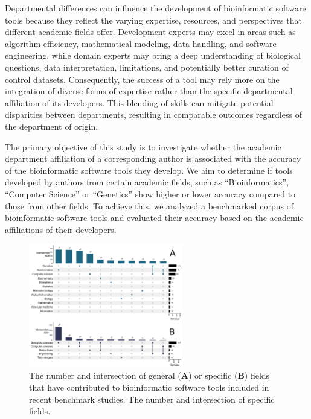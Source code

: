 \documentclass[fleqn,10pt,doc,onecolumn]{SelfArx}%
\begin{document}
Departmental differences can influence the development of
bioinformatic software tools because they reflect the varying
expertise, resources, and perspectives that different academic fields
offer. Development experts may excel in areas such as algorithm
efficiency, mathematical modeling, data handling, and software
engineering, while domain experts may bring a deep understanding of
biological questions, data interpretation, limitations, and
potentially better curation of control datasets. Consequently, the
success of a tool may rely more on the integration of diverse
forms of expertise rather than the specific departmental affiliation
of its developers. This blending of skills can mitigate potential
disparities between departments, resulting in comparable outcomes
regardless of the department of origin.


The primary objective of this study is to investigate whether the
academic department affiliation of a corresponding author is
associated with the accuracy of the bioinformatic software tools they
develop. We aim to determine if tools developed by authors from
certain academic fields, such as ``Bioinformatics'', ``Computer
Science'' or ``Genetics'' show higher or lower accuracy compared to
those from other fields. To achieve this, we analyzed a benchmarked
corpus of bioinformatic software tools and evaluated their accuracy
based on the academic affiliations of their developers.


\begin{figure}[ht!]
\begin{center}
  \includegraphics[width=0.6\textwidth]{upset-plots.pdf}
\end{center}
  \caption{ The number and intersection of general (\textbf{A}) or
  specific (\textbf{B}) fields that have contributed to bioinformatic
  software tools included in recent benchmark studies.  The number and
  intersection of specific fields.  }
\label{fig:fig1}
\end{figure}
\end{document}
